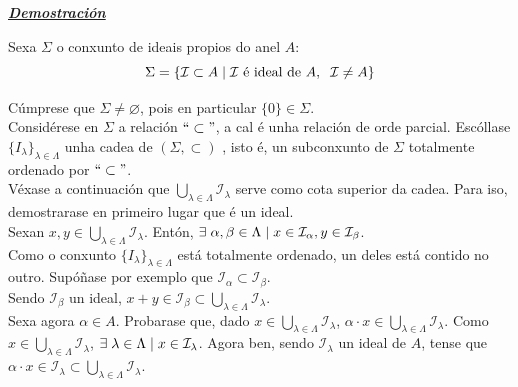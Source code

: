 \documentclass[twoside]{report}
\theoremstyle{mystyle}
\begin{document}
\noindent \textbf{\textit{\underline{Demostración}}}

\vspace{2mm}

\noindent Sexa $\Sigma$ o conxunto de ideais propios do anel $A$:
$$\Sigma = \{ \mathcal{I} \subset A \hspace{1MM} | \hspace{1MM} \mathcal{I} \text{ é ideal de } A, \hspace{2mm} \mathcal{I} \neq A\}$$

\noindent Cúmprese que $\Sigma \neq \varnothing$, pois en particular $\{0\} \in \Sigma$.\\

\noindent Considérese en $\Sigma$ a relación $``\subset"$, a cal é unha relación de orde parcial. Escóllase $\{I_{\lambda}\}_{\lambda \in \Lambda}$ unha cadea de $(\Sigma, \subset)$ , isto é, un subconxunto de $\Sigma$ totalmente ordenado por $`` \subset"$. \\

\noindent Véxase a continuación que $\underset{\lambda \in \Lambda}{\bigcup}\mathcal{I_{\lambda}}$ serve como cota superior da cadea. Para iso, demostrarase en primeiro lugar que é un ideal.\\

\noindent Sexan $x, y \in \underset{\lambda \in \Lambda}{\bigcup}\mathcal{I_{\lambda}}$. Entón, $\exists \hspace{1mm} \alpha, \beta \in \Lambda \hspace{1mm} | \hspace{1mm} x \in \mathcal{I}_{\alpha}, y \in \mathcal{I}_{\beta}$.\\

\noindent Como o conxunto $\{I_{\lambda}\}_{\lambda \in \Lambda}$ está totalmente ordenado, un deles está contido no outro. Supóñase por exemplo que $\mathcal{I}_{\alpha} \subset \mathcal{I}_{\beta}$.\\

\noindent Sendo $\mathcal{I}_{\beta}$ un ideal, $x + y \in \mathcal{I}_{\beta} \subset \underset{\lambda \in \Lambda}{\bigcup}\mathcal{I_{\lambda}}$.\\

\noindent Sexa agora $\alpha \in A$. Probarase que, dado $x \in \underset{\lambda \in \Lambda}{\bigcup}\mathcal{I_{\lambda}}$, $\alpha \cdot x \in \underset{\lambda \in \Lambda}{\bigcup}\mathcal{I_{\lambda}}$. Como $x \in \underset{\lambda \in \Lambda}{\bigcup}\mathcal{I_{\lambda}}$, $\exists \hspace{1mm} \lambda \in \Lambda \hspace{1mm} | \hspace{1mm} x \in \mathcal{I}_{\lambda}$. Agora ben, sendo $\mathcal{I}_{\lambda}$ un ideal de $A$, tense que $\alpha \cdot x \in \mathcal{I}_{\lambda} \subset \underset{\lambda \in \Lambda}{\bigcup}\mathcal{I_{\lambda}}$.\\
\end{document}

